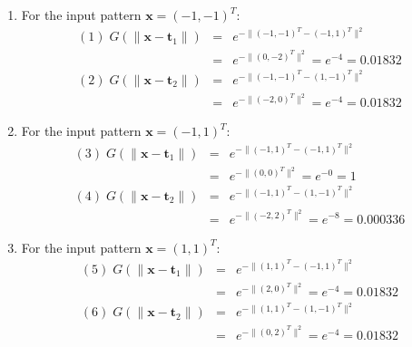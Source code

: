 \begin{enumerate}
\begin{solution}


    \begin{enumerate}
    \item For the input pattern $\mathbf{x}=(-1,-1)^T$:
      \begin{eqnarray*}
        (1)\;G(\|\mathbf{x}-\mathbf{t}_1\|)&=&e^{-\|(-1,-1)^T-(-1,1)^T\|^2}\\
        &=&e^{-\|(0,-2)^T\|^2}=e^{-4}=0.01832\\
        (2)\;G(\|\mathbf{x}-\mathbf{t}_2\|)&=&e^{-\|(-1,-1)^T-(1,-1)^T\|^2}\\
        &=&e^{-\|(-2,0)^T\|^2}=e^{-4}=0.01832
      \end{eqnarray*}

    \item For the input pattern $\mathbf{x}=(-1,1)^T$:
      \begin{eqnarray*}
        (3)\;G(\|\mathbf{x}-\mathbf{t}_1\|)&=&e^{-\|(-1,1)^T-(-1,1)^T\|^2}\\
        &=&e^{-\|(0,0)^T\|^2}=e^{-0}=1\\
        (4)\;G(\|\mathbf{x}-\mathbf{t}_2\|)&=&e^{-\|(-1,1)^T-(1,-1)^T\|^2}\\
        &=&e^{-\|(-2,2)^T\|^2}=e^{-8}=0.000336
      \end{eqnarray*}

    \item For the input pattern $\mathbf{x}=(1,1)^T$:
      \begin{eqnarray*}
        (5)\;G(\|\mathbf{x}-\mathbf{t}_1\|)&=&e^{-\|(1,1)^T-(-1,1)^T\|^2}\\
        &=&e^{-\|(2,0)^T\|^2}=e^{-4}=0.01832\\
        (6)\;G(\|\mathbf{x}-\mathbf{t}_2\|)&=&e^{-\|(1,1)^T-(1,-1)^T\|^2}\\
        &=&e^{-\|(0,2)^T\|^2}=e^{-4}=0.01832
      \end{eqnarray*}


\end{enumerate}
\end{solution}
\end{enumerate}
